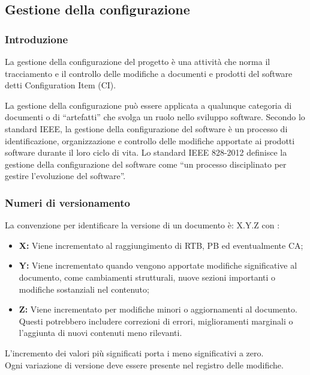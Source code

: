 \subsection{Gestione della configurazione}
\subsubsection{Introduzione}
La gestione della configurazione del progetto è una attività che norma il tracciamento e il controllo delle modifiche a documenti e prodotti del software detti Configuration Item (CI).

La gestione della configurazione può essere applicata a qualunque categoria di documenti o di “artefatti” che svolga un ruolo nello sviluppo software.
Secondo lo standard IEEE, la gestione della configurazione del software è un processo di identificazione, organizzazione e controllo delle modifiche apportate ai prodotti software durante il loro ciclo di vita.
Lo standard IEEE 828-2012 definisce la gestione della configurazione del software come “un processo disciplinato per gestire l’evoluzione del software”.

\subsubsection{Numeri di versionamento}\label{sec:versionamento}
La convenzione per identificare la versione di un documento è: X.Y.Z
con :
\begin{itemize}
    \item \textbf{X: }Viene incrementato al raggiungimento di RTB, PB ed eventualmente CA;
    \item \textbf{Y: }Viene incrementato quando vengono apportate modifiche significative al documento, come cambiamenti strutturali, nuove sezioni importanti o modifiche sostanziali nel contenuto;
    \item \textbf{Z: }Viene incrementato per modifiche minori o aggiornamenti al documento. Questi potrebbero includere correzioni di errori, miglioramenti marginali o l'aggiunta di nuovi contenuti meno rilevanti.
\end{itemize}

L'incremento dei valori più significati  porta i meno significativi a zero. \\
Ogni variazione di versione deve essere presente nel registro delle modifiche.


